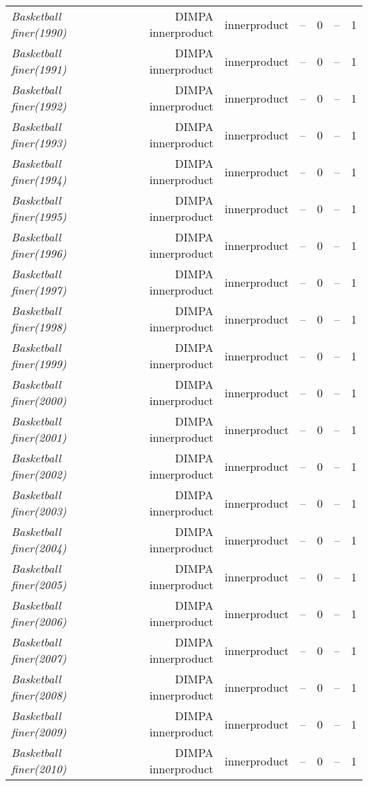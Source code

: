 \documentclass[nohyperref]{article}
\theoremstyle{plain}
\theoremstyle{definition}
\theoremstyle{remark}
\begin{document}
\begin{table*}[!ht]
{\begin{tabular}{lrrrrrr}
			{\it Basketball finer(1990)} & DIMPA innerproduct & innerproduct & -- & 0 & -- & 1 \\
			{\it Basketball finer(1991)} & DIMPA innerproduct & innerproduct & -- & 0 & -- & 1 \\
			{\it Basketball finer(1992)} & DIMPA innerproduct & innerproduct & -- & 0 & -- & 1 \\
			{\it Basketball finer(1993)} & DIMPA innerproduct & innerproduct & -- & 0 & -- & 1 \\
			{\it Basketball finer(1994)} & DIMPA innerproduct & innerproduct & -- & 0 & -- & 1 \\
			{\it Basketball finer(1995)} & DIMPA innerproduct & innerproduct & -- & 0 & -- & 1 \\
			{\it Basketball finer(1996)} & DIMPA innerproduct & innerproduct & -- & 0 & -- & 1 \\
			{\it Basketball finer(1997)} & DIMPA innerproduct & innerproduct & -- & 0 & -- & 1 \\
			{\it Basketball finer(1998)} & DIMPA innerproduct & innerproduct & -- & 0 & -- & 1 \\
			{\it Basketball finer(1999)} & DIMPA innerproduct & innerproduct & -- & 0 & -- & 1 \\
			{\it Basketball finer(2000)} & DIMPA innerproduct & innerproduct & -- & 0 & -- & 1 \\
			{\it Basketball finer(2001)} & DIMPA innerproduct & innerproduct & -- & 0 & -- & 1 \\
			{\it Basketball finer(2002)} & DIMPA innerproduct & innerproduct & -- & 0 & -- & 1 \\
			{\it Basketball finer(2003)} & DIMPA innerproduct & innerproduct & -- & 0 & -- & 1 \\
			{\it Basketball finer(2004)} & DIMPA innerproduct & innerproduct & -- & 0 & -- & 1 \\
			{\it Basketball finer(2005)} & DIMPA innerproduct & innerproduct & -- & 0 & -- & 1 \\
			{\it Basketball finer(2006)} & DIMPA innerproduct & innerproduct & -- & 0 & -- & 1 \\
			{\it Basketball finer(2007)} & DIMPA innerproduct & innerproduct & -- & 0 & -- & 1 \\
			{\it Basketball finer(2008)} & DIMPA innerproduct & innerproduct & -- & 0 & -- & 1 \\
			{\it Basketball finer(2009)} & DIMPA innerproduct & innerproduct & -- & 0 & -- & 1 \\
			{\it Basketball finer(2010)} & DIMPA innerproduct & innerproduct & -- & 0 & -- & 1 \\

\end{tabular}}
\end{table*}
\end{document}
